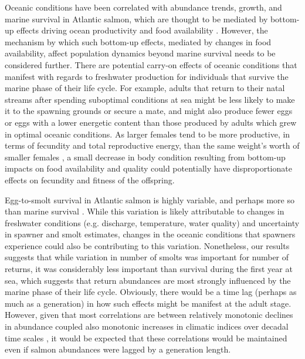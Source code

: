 \documentclass[12pt]{article}
\begin{document}
Oceanic conditions have been correlated with abundance trends, growth, and
marine survival in Atlantic salmon, which are thought to be mediated by
bottom-up effects driving ocean productivity and food availability
\citep{Todd2008, Renkawitz2015,Olmos2020}. 
However, the mechanism by which such bottom-up effects, mediated by changes in
food availability, affect population dynamics beyond marine survival needs to
be considered further. 
There are potential carry-on effects of oceanic conditions that manifest with
regards to freshwater production for individuals that survive the marine phase
of their life cycle. 
For example, adults that return to their natal streams after spending
suboptimal conditions at sea might be less likely to make it to the spawning
grounds or secure a mate, and might also produce fewer eggs or eggs with a
lower energetic content than those produced by adults which grew in optimal
oceanic conditions.
As larger females tend to be more productive, in terms of fecundity and total
reproductive energy, than the same weight's worth of smaller females
\citep{Barneche2018}, a small decrease in body condition resulting from bottom-up
impacts on food availability and quality could potentially have
disproportionate effects on fecundity and fitness of the offspring.


Egg-to-smolt survival in Atlantic salmon is highly variable, and perhaps more so
than marine survival \citep{Klemetsen2003,Chaput2015}.
While this variation is likely attributable to changes in freshwater
conditions (e.g. discharge, temperature, water quality) and uncertainty in
spawner and smolt estimates, 
changes in the oceanic conditions that spawners experience could also be
contributing to this variation.
Nonetheless, our results suggests that while variation in number of smolts was 
important for number of returns, it was considerably less important than
survival during the first year at sea, which suggests that return abundances 
are most strongly influenced by the marine phase of their life cycle.
Obviously, there would be a time lag (perhaps as much as a generation) in how such effects
might be manifest at the adult stage.
However, given that most correlations are between relatively monotonic declines
in abundance coupled also monotonic increases in climatic indices
over decadal time scales \citep[e.g.,][]{Friedland1998, Todd2008,
    Beaugrand2012}, it would be expected that these correlations would be
maintained even if salmon abundances were lagged by a generation length.
\end{document}

